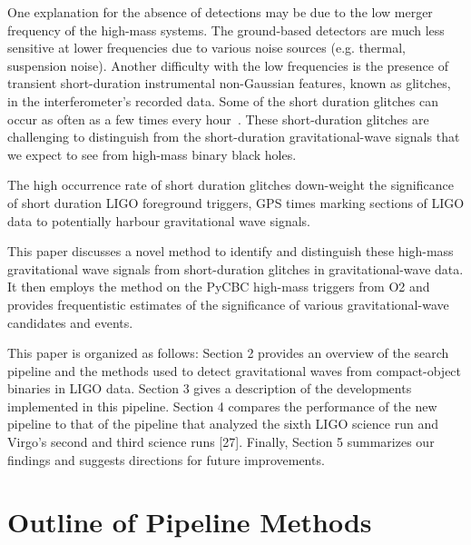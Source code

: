 \documentclass[%
 reprint,
 amsmath,amssymb,
 aps,
]{revtex4-2}
\begin{document}
One explanation for the absence of detections may be due to the low merger frequency of the high-mass systems. The ground-based detectors are much less sensitive at lower frequencies due to various noise sources (e.g. thermal, suspension noise). Another difficulty with the low frequencies is the presence of transient short-duration instrumental non-Gaussian features, known as glitches, in the interferometer's recorded data. Some of the short duration glitches can occur as often as a few times every hour~\cite{blipGlitches}. These short-duration glitches are challenging to distinguish from the short-duration gravitational-wave signals that we expect to see from high-mass binary black holes. 




The high occurrence rate of short duration glitches down-weight the significance of short duration LIGO foreground triggers, GPS times marking sections of LIGO data to potentially harbour gravitational wave signals.

This paper discusses a novel method to identify and distinguish these high-mass gravitational wave signals from short-duration glitches in gravitational-wave data. It then employs the method on the PyCBC high-mass triggers from O2 and provides frequentistic estimates of the significance of various gravitational-wave candidates and events. 

This paper is organized as follows: Section 2 provides an overview of the search
pipeline and the methods used to detect gravitational waves from compact-object
binaries in LIGO data. Section 3 gives a description of the developments implemented
in this pipeline. Section 4 compares the performance of the new pipeline to that of the
pipeline that analyzed the sixth LIGO science run and Virgo’s second and third science
runs [27]. Finally, Section 5 summarizes our findings and suggests directions for future
improvements.

\section{\label{sec:OutlineOfPipelineMethods}Outline of Pipeline Methods}
\end{document}
